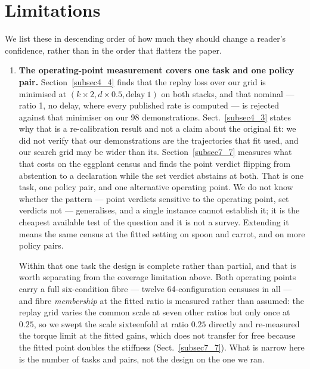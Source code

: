 \documentclass[pdflatex,iicol,sn-apa]{sn-jnl}
\theoremstyle{remark}
\begin{document}
\section{Limitations}\label{sec9}

We list these in descending order of how much they should change a reader's confidence, rather than
in the order that flatters the paper.

\begin{enumerate}
\item \textbf{The operating-point measurement covers one task and one policy pair.}
Section~\ref{subsec4_4} finds that the replay loss over our grid is minimised at
$(k{\times}2, d{\times}0.5, \text{delay}\ 1)$ on both stacks, and that nominal --- ratio 1, no delay,
where every published rate is computed --- is rejected against that minimiser on our 98
demonstrations. Sect.~\ref{subsec4_3} states why that is a re-calibration result and not a claim
about the original fit: we did not verify that our demonstrations are the trajectories that fit
used, and our search grid may be wider than its.
Section~\ref{subsec7_7} measures what that costs on the eggplant census and finds the point verdict
flipping from abstention to a declaration while the set verdict abstains at both. That is one task,
one policy pair, and one alternative operating point. We do not know whether the pattern --- point
verdicts sensitive to the operating point, set verdicts not --- generalises, and a single instance cannot
establish it; it is the cheapest available test of the question and it is not a survey. Extending it
means the same census at the fitted setting on spoon and carrot, and on more policy pairs.

Within that one task the design is complete rather than partial, and that is worth separating from
the coverage limitation above. Both operating points carry a full six-condition fibre --- twelve
64-configuration censuses in all --- and fibre \emph{membership} at the fitted ratio is measured
rather than assumed: the replay grid varies the common scale at seven other ratios but only once at
$0.25$, so we swept the scale sixteenfold at ratio $0.25$ directly and re-measured the torque limit
at the fitted gains, which does not transfer for free because the fitted point doubles the stiffness
(Sect.~\ref{subsec7_7}). What is narrow here is the number of tasks and pairs, not the design on the
one we ran.


\end{enumerate}
\end{document}
